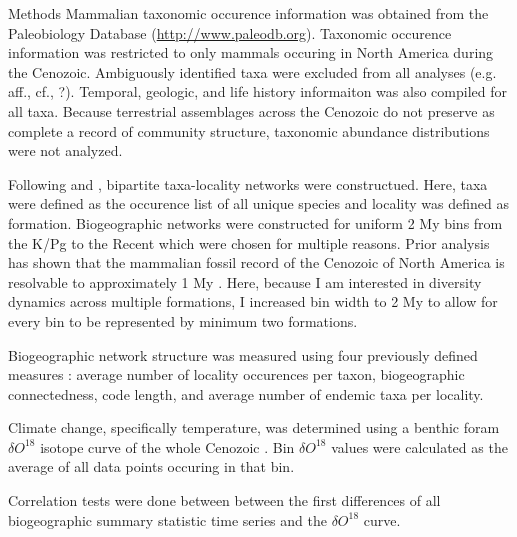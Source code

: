 \documentclass[final]{beamer}\usepackage[]{graphicx}\usepackage[]{color}
\newlength{\onecolwid}
\begin{document}
\begin{frame}[t]
\begin{columns}[t]
\begin{column}{\onecolwid}
      \begin{footnotesize}
      \begin{block}{Methods}
        Mammalian taxonomic occurence information was obtained from the Paleobiology Database (\url{http://www.paleodb.org}). Taxonomic occurence information was restricted to only mammals occuring in North America during the Cenozoic. Ambiguously identified taxa were excluded from all analyses (e.g. aff., cf., ?). Temporal, geologic, and life history informaiton was also compiled for all taxa. Because terrestrial assemblages across the Cenozoic do not preserve as complete a record of community structure, taxonomic abundance distributions were not analyzed.

        Following \citet{Sidor2013} and \citet{Vilhena2013}, bipartite taxa-locality networks were constructued. Here, taxa were defined as the occurence list of all unique species and locality was defined as formation. Biogeographic networks were constructed for uniform 2 My bins from the K/Pg to the Recent which were chosen for multiple reasons. Prior analysis has shown that the mammalian fossil record of the Cenozoic of North America is resolvable to approximately 1 My \citep{Alroy1996a,Alroy2000g}. Here, because I am interested in diversity dynamics across multiple formations, I increased bin width to 2 My to allow for every bin to be represented by minimum two formations.

        Biogeographic network structure was measured using four previously defined measures \citep{Sidor2013}: average number of locality occurences per taxon, biogeographic connectedness, code length, and average number of endemic taxa per locality. 

        Climate change, specifically temperature, was determined using a benthic foram \(\delta O^{18}\) isotope curve of the whole Cenozoic \citep{Zachos2008}. Bin \(\delta O^{18}\) values were calculated as the average of all data points occuring in that bin.%

        Correlation tests were done between between the first differences of all biogeographic summary statistic time series and the \(\delta O^{18}\) curve. 

      \end{block}
      \end{footnotesize}

    \end{column}


\end{columns}
\end{frame}
\end{document}
